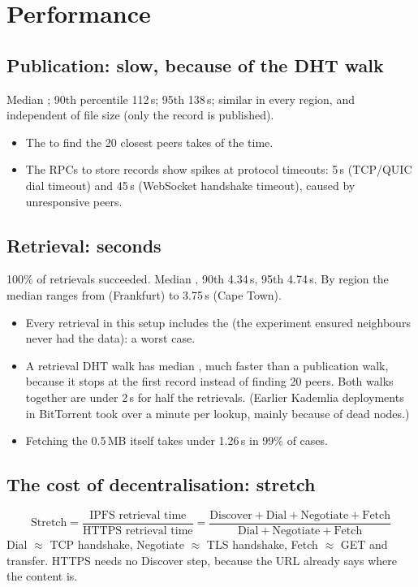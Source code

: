 \section{Performance}

\subsection{Publication: slow, because of the DHT walk}
Median ; 90th percentile 112\,s; 95th 138\,s; similar in every region, and independent of file size (only the record is published).
\begin{itemize}
  \item The  to find the 20 closest peers takes  of the time.
  \item The RPCs to store records show spikes at protocol timeouts: 5\,s (TCP/QUIC dial timeout) and 45\,s (WebSocket handshake timeout), caused by unresponsive peers.
\end{itemize}

\subsection{Retrieval: seconds}
100\% of retrievals succeeded. Median , 90th 4.34\,s, 95th 4.74\,s. By region the median ranges from  (Frankfurt) to 3.75\,s (Cape Town).
\begin{itemize}
  \item Every retrieval in this setup includes the  (the experiment ensured neighbours never had the data): a worst case.
  \item A retrieval DHT walk has median , much faster than a publication walk, because it stops at the first record instead of finding 20 peers. Both walks
        together are under 2\,s for half the retrievals. (Earlier Kademlia deployments in BitTorrent took over a minute per lookup, mainly because of dead nodes.)
  \item Fetching the 0.5\,MB itself takes under 1.26\,s in 99\% of cases.
\end{itemize}

\subsection{The cost of decentralisation: stretch}
\[
\text{Stretch} = \frac{\text{IPFS retrieval time}}{\text{HTTPS retrieval time}} = \frac{\text{Discover} + \text{Dial} + \text{Negotiate} + \text{Fetch}}{\text{Dial} + \text{Negotiate} + \text{Fetch}}
\]
Dial $\approx$ TCP handshake, Negotiate $\approx$ TLS handshake, Fetch $\approx$ GET and transfer. HTTPS needs no Discover step, because the URL already says where the content is.

